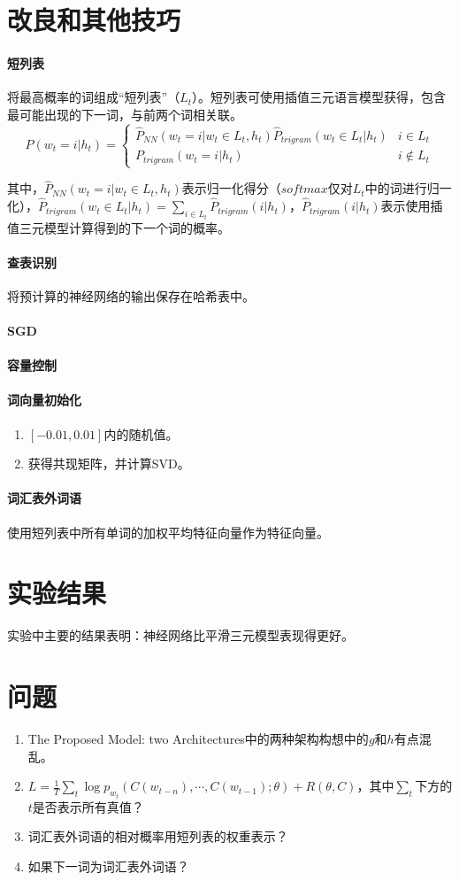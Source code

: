 \documentclass[UTF8]{ctexart}
\begin{document}
\section{改良和其他技巧}
\paragraph{短列表}
将最高概率的词组成“短列表”（$L_{t}$）。短列表可使用插值三元语言模型获得，包含最可能出现的下一词，与前两个词相关联。
$$
P(w_{t}=i|h_{t})=
\begin{cases}
\widehat{P}_{NN}(w_{t}=i|w_{t}\in L_{t},h_{t})\widehat{P}_{trigram}(w_{t}\in L_{t}|h_{t}) & {i\in L_{t}}\\
P_{trigram}(w_{t}=i|h_{t}) & {i\notin L_{t}}
\end{cases}
$$
\par{其中，$\widehat{P}_{NN}(w_{t}=i|w_{t}\in L_{t},h_{t})$表示归一化得分（$softmax$仅对$L_{t}$中的词进行归一化），$\widehat{P}_{trigram}(w_{t}\in L_{t}|h_{t})=\sum_{i\in L_{t}}\widehat{P}_{trigram}(i|h_{t})$，$\widehat{P}_{trigram}(i|h_{t})$表示使用插值三元模型计算得到的下一个词的概率。}
\paragraph{查表识别}
将预计算的神经网络的输出保存在哈希表中。
\paragraph{SGD}
\paragraph{容量控制}
\paragraph{词向量初始化}
\begin{enumerate}
  \item $[-0.01,0.01]$内的随机值。
  \item 获得共现矩阵，并计算SVD。
\end{enumerate}
\paragraph{词汇表外词语}
使用短列表中所有单词的加权平均特征向量作为特征向量。
\section{实验结果}
\par{实验中主要的结果表明：神经网络比平滑三元模型表现得更好。}
\section{问题}
\begin{enumerate}
  \item The Proposed Model: two Architectures中的两种架构构想中的$g$和$h$有点混乱。
  \item $L=\frac{1}{T}\sum_{t}\log p_{w_{t}}(C(w_{t-n}),\cdots,C(w_{t-1});\theta)+R(\theta,C)$，其中$\sum_{t}$下方的$t$是否表示所有真值？
  \item 词汇表外词语的相对概率用短列表的权重表示？
  \item 如果下一词为词汇表外词语？
\end{enumerate}
\end{document}
